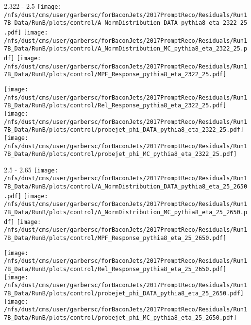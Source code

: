 \documentclass[t,compress]{beamer}
\begin{document}
\begin{frame}{2.322 - 2.5}
	\texttt{[image: /nfs/dust/cms/user/garbersc/forBaconJets/2017PromptReco/Residuals/Run17B\_Data/RunB/plots/control/A\_NormDistribution\_DATA\_pythia8\_eta\_2322\_25.pdf]}
	\texttt{[image: /nfs/dust/cms/user/garbersc/forBaconJets/2017PromptReco/Residuals/Run17B\_Data/RunB/plots/control/A\_NormDistribution\_MC\_pythia8\_eta\_2322\_25.pdf]}
	\texttt{[image: /nfs/dust/cms/user/garbersc/forBaconJets/2017PromptReco/Residuals/Run17B\_Data/RunB/plots/control/MPF\_Response\_pythia8\_eta\_2322\_25.pdf]}
\newline

	\texttt{[image: /nfs/dust/cms/user/garbersc/forBaconJets/2017PromptReco/Residuals/Run17B\_Data/RunB/plots/control/Rel\_Response\_pythia8\_eta\_2322\_25.pdf]}
	\texttt{[image: /nfs/dust/cms/user/garbersc/forBaconJets/2017PromptReco/Residuals/Run17B\_Data/RunB/plots/control/probejet\_phi\_DATA\_pythia8\_eta\_2322\_25.pdf]}
	\texttt{[image: /nfs/dust/cms/user/garbersc/forBaconJets/2017PromptReco/Residuals/Run17B\_Data/RunB/plots/control/probejet\_phi\_MC\_pythia8\_eta\_2322\_25.pdf]}
\end{frame}

\begin{frame}{2.5 - 2.65}
	\texttt{[image: /nfs/dust/cms/user/garbersc/forBaconJets/2017PromptReco/Residuals/Run17B\_Data/RunB/plots/control/A\_NormDistribution\_DATA\_pythia8\_eta\_25\_2650.pdf]}
	\texttt{[image: /nfs/dust/cms/user/garbersc/forBaconJets/2017PromptReco/Residuals/Run17B\_Data/RunB/plots/control/A\_NormDistribution\_MC\_pythia8\_eta\_25\_2650.pdf]}
	\texttt{[image: /nfs/dust/cms/user/garbersc/forBaconJets/2017PromptReco/Residuals/Run17B\_Data/RunB/plots/control/MPF\_Response\_pythia8\_eta\_25\_2650.pdf]}
\newline

	\texttt{[image: /nfs/dust/cms/user/garbersc/forBaconJets/2017PromptReco/Residuals/Run17B\_Data/RunB/plots/control/Rel\_Response\_pythia8\_eta\_25\_2650.pdf]}
	\texttt{[image: /nfs/dust/cms/user/garbersc/forBaconJets/2017PromptReco/Residuals/Run17B\_Data/RunB/plots/control/probejet\_phi\_DATA\_pythia8\_eta\_25\_2650.pdf]}
	\texttt{[image: /nfs/dust/cms/user/garbersc/forBaconJets/2017PromptReco/Residuals/Run17B\_Data/RunB/plots/control/probejet\_phi\_MC\_pythia8\_eta\_25\_2650.pdf]}
\end{frame}
\end{document}
